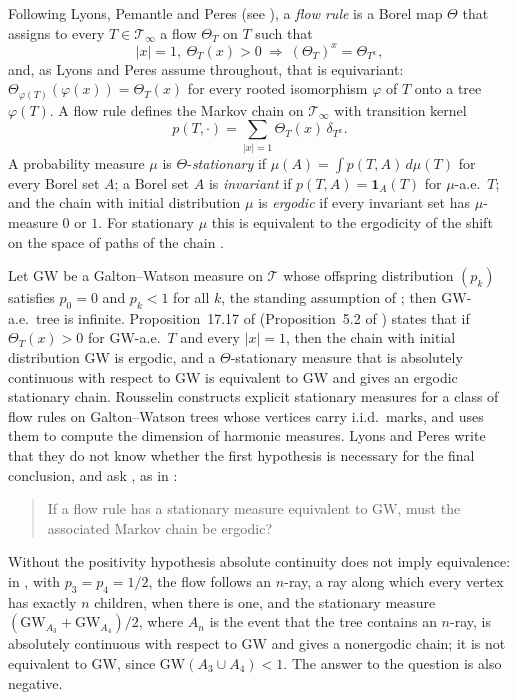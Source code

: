 \documentclass[11pt]{amsart}
\theoremstyle{remark}
\numberwithin{equation}{section}
\newcommand{\T}{\mathcal T}
\newcommand{\GW}{\mathrm{GW}}
\newcommand{\one}{\mathbf 1}
\begin{document}
Following Lyons, Pemantle and Peres \cite{LPP} (see \cite[Section~17.5]{LP}), a \emph{flow rule} is a Borel map $\Theta$ that assigns to every $T\in\T_\infty$ a flow $\Theta_T$ on $T$ such that
\[
|x|=1,\ \Theta_T(x)>0\ \Longrightarrow\ (\Theta_T)^x=\Theta_{T^x},
\]
and, as Lyons and Peres assume throughout, that is equivariant: $\Theta_{\varphi(T)}(\varphi(x))=\Theta_T(x)$ for every rooted isomorphism $\varphi$ of $T$ onto a tree $\varphi(T)$. A flow rule defines the Markov chain on $\T_\infty$ with transition kernel
\[
p(T,\cdot)=\sum_{|x|=1}\Theta_T(x)\,\delta_{T^x}.
\]
A probability measure $\mu$ is $\Theta$-\emph{stationary} if $\mu(A)=\int p(T,A)\,d\mu(T)$ for every Borel set $A$; a Borel set $A$ is \emph{invariant} if $p(T,A)=\one_A(T)$ for $\mu$-a.e.\ $T$; and the chain with initial distribution $\mu$ is \emph{ergodic} if every invariant set has $\mu$-measure $0$ or $1$. For stationary $\mu$ this is equivalent to the ergodicity of the shift on the space of paths of the chain \cite[Corollary~17.3]{LP}.

Let $\GW$ be a Galton--Watson measure on $\T$ whose offspring distribution $(p_k)$ satisfies $p_0=0$ and $p_k<1$ for all $k$, the standing assumption of \cite[Chapter~17]{LP}; then $\GW$-a.e.\ tree is infinite. Proposition~17.17 of \cite{LP} (Proposition~5.2 of \cite{LPP}) states that if $\Theta_T(x)>0$ for $\GW$-a.e.\ $T$ and every $|x|=1$, then the chain with initial distribution $\GW$ is ergodic, and a $\Theta$-stationary measure that is absolutely continuous with respect to $\GW$ is equivalent to $\GW$ and gives an ergodic stationary chain. Rousselin \cite{Ro18} constructs explicit stationary measures for a class of flow rules on Galton--Watson trees whose vertices carry i.i.d.\ marks, and uses them to compute the dimension of harmonic measures. Lyons and Peres write that they do not know whether the first hypothesis is necessary for the final conclusion, and ask \cite[Question~17.18]{LP}, as in \cite[Section~10, Question~3]{LPP}:

\begin{quote}
If a flow rule has a stationary measure equivalent to $\GW$, must the associated Markov chain be ergodic?
\end{quote}

\noindent Without the positivity hypothesis absolute continuity does not imply equivalence: in \cite[Exercise~17.22]{LP}, with $p_3=p_4=1/2$, the flow follows an $n$-ray, a ray along which every vertex has exactly $n$ children, when there is one, and the stationary measure $(\GW_{A_3}+\GW_{A_4})/2$, where $A_n$ is the event that the tree contains an $n$-ray, is absolutely continuous with respect to $\GW$ and gives a nonergodic chain; it is not equivalent to $\GW$, since $\GW(A_3\cup A_4)<1$. The answer to the question is also negative.
\end{document}
